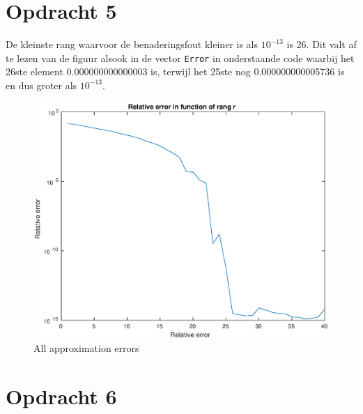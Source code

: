 \documentclass[11pt,a4paper]{article}
\begin{document}




\section*{Opdracht 5}
De kleinste rang waarvoor de benaderingsfout kleiner is als $10^{-13}$ is 26.
Dit valt af te lezen van de figuur alsook in de vector \texttt{Error} in onderstaande code waarbij het 26ste element 0.000000000000003 is, terwijl het 25ste nog 0.000000000005736 is en dus groter als $10^{-13}$.
\begin{figure}[H]
\centering
\includegraphics[scale=0.55]{opdracht5}
\caption{All approximation errors}
\end{figure}




\section*{Opdracht 6}
\end{document}
